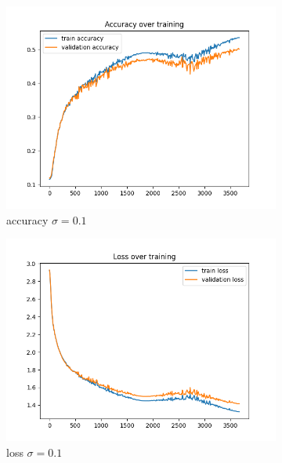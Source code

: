 \documentclass[a4paper]{article}
\begin{document}
\begin{figure}[h]
	\centering
	\begin{subfigure}{0.3\textwidth}
		\centering
		\includegraphics[width=\linewidth]{images/sens_sigma_0.1_use_bn_False_acc.png}
		\caption{accuracy $\sigma=0.1$}
	\end{subfigure}
	\begin{subfigure}{0.3\textwidth}
		\centering
		\includegraphics[width=\linewidth]{images/sens_sigma_0.1_use_bn_False_loss.png}
		\caption{loss $\sigma=0.1$}
	\end{subfigure}
	\begin{subfigure}{0.3\textwidth}
		\centering

\end{subfigure}
\end{figure}
\end{document}
